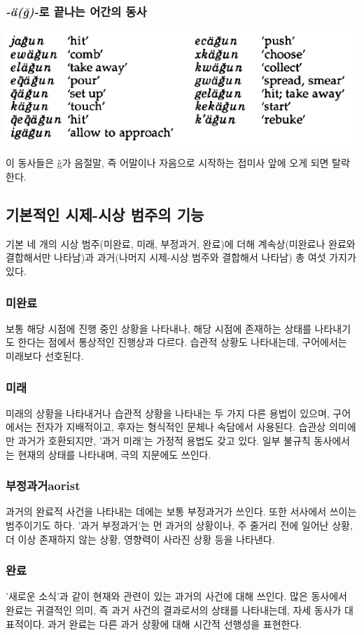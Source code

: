\subsubsection{\textit{-ä(ǧ)-}로 끝나는 어간의 동사}
\begin{center}
\includegraphics{Lezgian/src/agve.png}
\end{center}
이 동사들은 ǧ가 음절말, 즉 어말이나 자음으로 시작하는 접미사 앞에 오게 되면 탈락한다.  
\subsection{기본적인 시제-시상 범주의 기능}
기본 네 개의 시상 범주(미완료, 미래, 부정과거, 완료)에 더해 계속상(미완료나 완료와 결합해서만 나타남)과 과거(나머지 시제-시상 범주와 결합해서 나타남) 총 여섯 가지가 있다.
\subsubsection{미완료}
보통 해당 시점에 진행 중인 상황을 나타내나, 해당 시점에 존재하는 상태를 나타내기도 한다는 점에서 통상적인 진행상과 다르다. 습관적 상황도 나타내는데, 구어에서는 미래보다 선호된다.
\subsubsection{미래}
미래의 상황을 나타내거나 습관적 상황을 나타내는 두 가지 다른 용법이 있으며, 구어에서는 전자가 지배적이고, 후자는 형식적인 문체나 속담에서 사용된다. 습관상 의미에만 과거가 호환되지만, '과거 미래'는 가정적 용법도 갖고 있다. 일부 불규칙 동사에서는 현재의 상태를 나타내며, 극의 지문에도 쓰인다.
\subsubsection{부정과거aorist}
과거의 완료적 사건을 나타내는 데에는 보통 부정과거가 쓰인다. 또한 서사에서 쓰이는 범주이기도 하다. '과거 부정과거'는 먼 과거의 상황이나, 주 줄거리 전에 일어난 상황, 더 이상 존재하지 않는 상황, 영향력이 사라진 상황 등을 나타낸다.
\subsubsection{완료}
'새로운 소식'과 같이 현재와 관련이 있는 과거의 사건에 대해 쓰인다. 많은 동사에서 완료는 귀결적인 의미, 즉 과거 사건의 결과로서의 상태를 나타내는데, 자세 동사가 대표적이다. 과거 완료는 다른 과거 상황에 대해 시간적 선행성을 표현한다.
